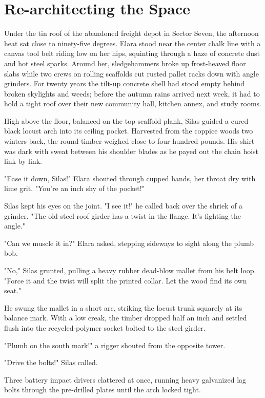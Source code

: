 \chapter{Re-architecting the Space}

Under the tin roof of the abandoned freight depot in Sector Seven, the afternoon heat sat close to ninety-five degrees. Elara stood near the center chalk line with a canvas tool belt riding low on her hips, squinting through a haze of concrete dust and hot steel sparks. Around her, sledgehammers broke up frost-heaved floor slabs while two crews on rolling scaffolds cut rusted pallet racks down with angle grinders. For twenty years the tilt-up concrete shell had stood empty behind broken skylights and weeds; before the autumn rains arrived next week, it had to hold a tight roof over their new community hall, kitchen annex, and study rooms.

High above the floor, balanced on the top scaffold plank, Silas guided a cured black locust arch into its ceiling pocket. Harvested from the coppice woods two winters back, the round timber weighed close to four hundred pounds. His shirt was dark with sweat between his shoulder blades as he payed out the chain hoist link by link.

"Ease it down, Silas!" Elara shouted through cupped hands, her throat dry with lime grit. "You're an inch shy of the pocket!"

Silas kept his eyes on the joint. "I see it!" he called back over the shriek of a grinder. "The old steel roof girder has a twist in the flange. It's fighting the angle."

"Can we muscle it in?" Elara asked, stepping sideways to sight along the plumb bob.

"No," Silas grunted, pulling a heavy rubber dead-blow mallet from his belt loop. "Force it and the twist will split the printed collar. Let the wood find its own seat."

He swung the mallet in a short arc, striking the locust trunk squarely at its balance mark. With a low creak, the timber dropped half an inch and settled flush into the recycled-polymer socket bolted to the steel girder.

"Plumb on the south mark!" a rigger shouted from the opposite tower.

"Drive the bolts!" Silas called.

Three battery impact drivers clattered at once, running heavy galvanized lag bolts through the pre-drilled plates until the arch locked tight.

